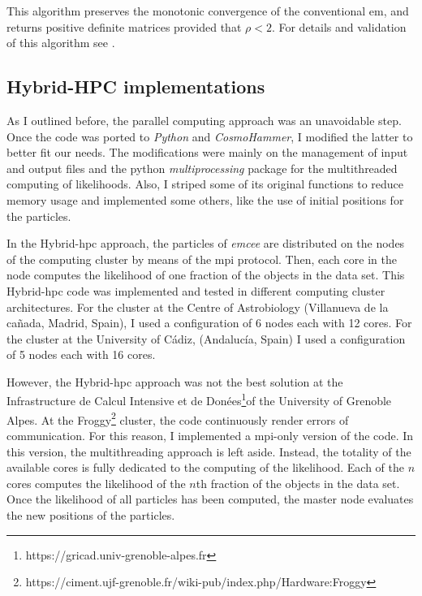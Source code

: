  This algorithm preserves the monotonic convergence of the conventional \gls{em}, and returns positive definite matrices provided that $\rho < 2$. For details and validation of this algorithm see \citet{McMichael1996}.

\subsection{Hybrid-HPC implementations}
\label{sect:HHPC}
As I outlined before, the parallel computing approach was an unavoidable step. Once the code was ported to \emph{Python} and \emph{CosmoHammer}, I modified the latter to better fit our needs. The modifications were mainly on the management of input and output files and the python \emph{multiprocessing} package for the multithreaded computing of likelihoods. Also, I striped some of its original functions to reduce memory usage and implemented some others, like the use of initial positions for the particles.

In the Hybrid-\gls{hpc} approach, the particles of \emph{emcee} are distributed on the nodes of the computing cluster by means of the \gls{mpi} protocol. Then, each core in the node computes the likelihood of one fraction of the objects in the data set. This Hybrid-\gls{hpc} code was implemented and tested in different computing cluster architectures. For the cluster at the Centre of Astrobiology (Villanueva de la ca\~nada, Madrid, Spain), I used a configuration of 6 nodes each with 12 cores. For the cluster at the University of C\'adiz, (Andalucía, Spain) I used a configuration of 5 nodes each with 16 cores.

However, the  Hybrid-\gls{hpc} approach was not the best solution at the Infrastructure de Calcul Intensive et de Donées\footnote{https://gricad.univ-grenoble-alpes.fr}of the University of Grenoble Alpes. At the Froggy\footnote{https://ciment.ujf-grenoble.fr/wiki-pub/index.php/Hardware:Froggy} cluster, the code continuously render errors of communication. For this reason, I implemented a \gls{mpi}-only version of the code. In this version, the multithreading approach is left aside. Instead, the totality of the available cores is fully dedicated to the computing of the likelihood. Each of the $n$ cores computes the likelihood of the $n$th fraction of the objects in the data set. Once the likelihood of all particles has been computed, the master node evaluates the new positions of the particles.

